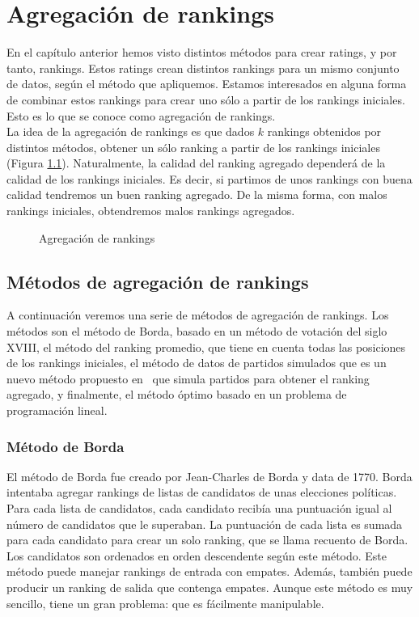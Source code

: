 \chapter{Agregación de rankings}

En el capítulo anterior hemos visto distintos métodos para crear ratings, y por tanto, rankings. Estos ratings crean distintos rankings para un mismo conjunto de datos, según el método que apliquemos. Estamos interesados en alguna forma de combinar estos rankings para crear uno sólo a partir de los rankings iniciales. Esto es lo que se conoce como agregación de rankings. \\

La idea de la agregación de rankings es que dados $k$ rankings obtenidos por distintos métodos, obtener un sólo ranking a partir de los rankings iniciales (Figura \ref{fig:agregacion_rankings}). Naturalmente, la calidad del ranking agregado dependerá de la calidad de los rankings iniciales. Es decir, si partimos de unos rankings con buena calidad tendremos un buen ranking agregado. De la misma forma, con malos rankings iniciales, obtendremos malos rankings agregados. 

\begin{figure}[htb]
\centering
\agregacionrankings
\caption{Agregación de rankings}
\label{fig:agregacion_rankings}
\end{figure}

\section{Métodos de agregación de rankings}
A continuación veremos una serie de métodos de agregación de rankings. Los métodos son el método de Borda, basado en un método de votación del siglo XVIII, el método del ranking promedio, que tiene en cuenta todas las posiciones de los rankings iniciales, el método de datos de partidos simulados que es un nuevo método propuesto en~\cite{langville2012s} que simula partidos para obtener el ranking agregado, y finalmente, el método óptimo basado en un problema de programación lineal.
\subsection{Método de Borda}
El método de Borda fue creado por Jean-Charles de Borda y data de 1770. Borda intentaba agregar rankings de listas de candidatos de unas elecciones políticas. Para cada lista de candidatos, cada candidato recibía una puntuación igual al número de candidatos que le superaban. La puntuación de cada lista es sumada para cada candidato para crear un solo ranking, que se llama recuento de Borda. Los candidatos son ordenados en orden descendente según este método. Este método puede manejar rankings de entrada con empates. Además, también puede producir un ranking de salida que contenga empates.  Aunque este método es muy sencillo, tiene un gran problema: que es fácilmente manipulable.

